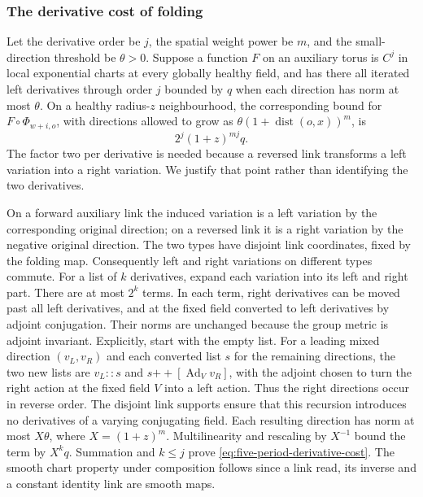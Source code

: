 \subsubsection{The derivative cost of folding}
Let the derivative order be $j$, the spatial weight power be $m$,
and the small-direction threshold be $\theta>0$. Suppose a
function $F$ on an auxiliary torus is $C^j$ in local exponential
charts at every globally healthy field, and has there all iterated
left derivatives through order $j$ bounded by $q$ when each direction
has norm at most $\theta$. On a healthy radius-$z$ neighbourhood, the
corresponding
bound for $F\circ\Phi_{w+i,o}$, with directions allowed to grow
as $\theta(1+\operatorname{dist}(o,x))^m$, is
\begin{equation}\label{eq:five-period-derivative-cost}
                          2^j(1+z)^{mj}q.
\end{equation}
The factor two per derivative is needed because a reversed link
transforms a left variation into a right variation. We justify
that point rather than identifying the two derivatives.

On a forward auxiliary link the induced variation is a left
variation by the corresponding original direction; on a reversed
link it is a right variation by the negative original direction.
The two types have disjoint link coordinates, fixed by the folding
map. Consequently left and right variations on different types
commute. For a list of $k$ derivatives, expand each variation into
its left and right part. There are at most $2^k$ terms. In each
term, right derivatives can be moved past all left derivatives,
and at the fixed field converted to left derivatives by adjoint
conjugation. Their norms are unchanged because the group metric
is adjoint invariant. Explicitly, start with the empty list. For a leading mixed
direction $(v_L,v_R)$ and each converted list $s$ for the remaining
directions, the two new lists are $v_L::s$ and
$s\mathbin{+\!+}[\operatorname{Ad}_{V}v_R]$, with the adjoint
chosen to turn the right action at the fixed field $V$ into a left
action. Thus the right directions occur in reverse order. The
disjoint link supports ensure that this recursion introduces no
derivatives of a varying conjugating field. Each resulting direction has norm at most
$X\theta$, where $X=(1+z)^m$. Multilinearity and rescaling by
$X^{-1}$ bound the term by $X^kq$. Summation and $k\le j$ prove
\eqref{eq:five-period-derivative-cost}. The smooth chart property
under composition follows since a link read, its inverse and a
constant identity link are smooth maps.


